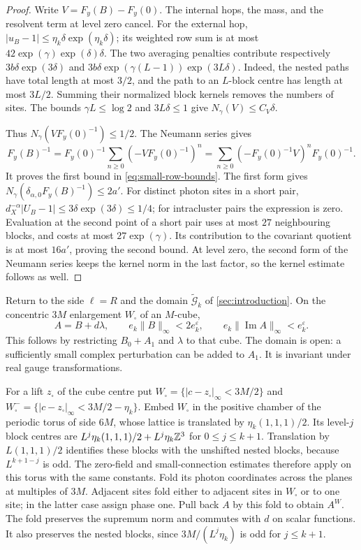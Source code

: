 \begin{proof}
Write $V=F_y(B)-F_y(0)$. The internal hops, the mass, and the
resolvent term at level zero cancel. For the external hop,
$|u_B-1|\le\eta_k\delta\exp(\eta_k\delta)$; its weighted row sum
is at most $42\exp(\gamma)\exp(\delta)\delta$. The two averaging
penalties contribute respectively
$3b\delta\exp(3\delta)$ and
$3b\delta\exp(\gamma(L-1))\exp(3L\delta)$. Indeed, the nested paths
have total length at most $3/2$, and the path to an $L$-block centre
has length at most $3L/2$. Summing their normalized block kernels
removes the numbers of sites. The bounds $\gamma L\le\log2$ and
$3L\delta\le1$ give $N_\gamma(V)\le C_V\delta$.

Thus $N_\gamma(VF_y(0)^{-1})\le1/2$. The Neumann series gives
\[
 F_y(B)^{-1}=F_y(0)^{-1}
                  \sum_{n\ge0}(-VF_y(0)^{-1})^n
             =\sum_{n\ge0}(-F_y(0)^{-1}V)^nF_y(0)^{-1}.
\]
It proves the first bound in \eqref{eq:small-row-bounds}. The first
form gives $N_\gamma(\delta_{\alpha,0}F_y(B)^{-1})\le2a'$.
For distinct photon sites in a short pair,
$d_X^{-\alpha}|U_B-1|\le3\delta\exp(3\delta)\le1/4$;
for intracluster pairs the expression is zero. Evaluation at the
second point of a short pair uses at most $27$ neighbouring blocks,
and costs at most $27\exp(\gamma)$. Its contribution to the covariant
quotient is at most $16a'$, proving the second bound. At level zero,
the second form of the Neumann series keeps the kernel norm in the
last factor, so the kernel estimate follows as well.
\end{proof}

Return to the side $\ell=R$ and the domain
$\widetilde{\mathcal G}_k$ of \cref{sec:introduction}.
On the concentric $3M$ enlargement $W_\square$ of an $M$-cube,
\begin{equation}\label{eq:local-small-gauge}
 A=B+d\lambda,\qquad e_k\|B\|_\infty<2e_k^\varepsilon,
 \qquad e_k\|\operatorname{Im}A\|_\infty<e_k^\varepsilon.
\end{equation}
This follows by restricting $B_0+A_1$ and $\lambda$ to that cube.
The domain is open: a sufficiently small complex perturbation can be
added to $A_1$. It is invariant under real gauge transformations.

For a lift $z_\square$ of the cube centre put
$W_\square=\{|c-z_\square|_\infty<3M/2\}$ and
$W_\square^-=\{|c-z_\square|_\infty<3M/2-\eta_k\}$.
Embed $W_\square$ in the positive chamber of the periodic torus of
side $6M$, whose lattice is translated by $\eta_k(1,1,1)/2$.
Its level-$j$ block centres are
$L^j\eta_k(1,1,1)/2+L^j\eta_k\mathbb Z^3$ for $0\le j\le k+1$.
Translation by $L(1,1,1)/2$ identifies these blocks with the
unshifted nested blocks, because $L^{k+1-j}$ is odd. The zero-field
and small-connection estimates therefore apply on this torus with
the same constants.
Fold its photon coordinates across the planes at multiples of $3M$.
Adjacent sites fold either to adjacent sites in $W_\square$ or to
one site; in the latter case assign phase one. Pull back $A$ by this
fold to obtain $A^W$. The fold preserves the supremum norm and
commutes with $d$ on scalar functions. It also preserves the nested
blocks, since $3M/(L^j\eta_k)$ is odd for $j\le k+1$.


